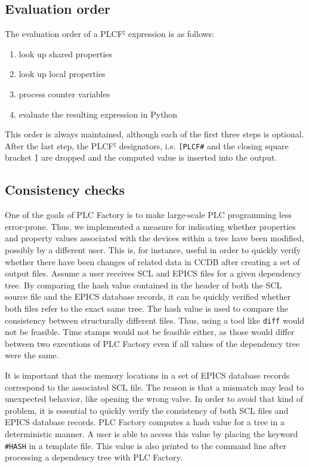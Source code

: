 \documentclass[a4paper,
              ]{jacow}
\begin{document}
\subsection{Evaluation order}

The evaluation order of a PLCF$^\sharp$ expression is as follows:

\begin{enumerate}
\item look up shared properties
\item look up local properties
\item process counter variables
\item evaluate the resulting expression in Python
\end{enumerate}

This order is always maintained, although each of the first three steps is optional. After the last step, the PLCF$^\sharp$ designators, i.e. \texttt{[PLCF\#} and the closing square bracket \texttt{]} are dropped and the computed value is inserted into the output.

\subsection{Consistency checks}
One of the goals of PLC Factory is to make large-scale PLC programming less error-prone. Thus, we implemented a measure for indicating whether properties and property values associated with the devices within a tree have been modified, possibly by a different user. This is, for instance, useful in order to quickly verify whether there have been changes of related data in CCDB after creating a set of output files. Assume a user receives SCL and EPICS files for a given dependency tree. By comparing the hash value contained in the header of both the SCL source file and the EPICS database records, it can be quickly verified whether both files refer to the exact same tree. The hash value is used to compare the consistency between structurally different files. Thus, using a tool like \texttt{diff} would not be feasible. Time stamps would not be feasible either, as those would differ between two executions of PLC Factory even if all values of the dependency tree were the same.

It is important that the memory locations in a set of EPICS database records correspond to the associated SCL file. The reason is that a mismatch may lead to unexpected behavior, like opening the wrong valve. In order to avoid that kind of problem, it is essential to quickly verify the consistency of both SCL files and EPICS database records. PLC Factory computes a hash value for a tree in a deterministic manner. A user is able to access this value by placing the keyword \texttt{\#HASH} in a template file. This value is also printed to the command line after processing a dependency tree with PLC Factory.
\end{document}
